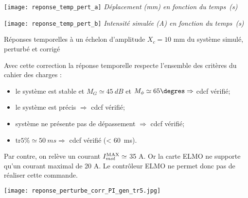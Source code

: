 \begin{marginfigure}
\texttt{[image: reponse\_temp\_pert\_a]}
\textit{Déplacement (mm) en fonction du temps~(s)}

\texttt{[image: reponse\_temp\_pert\_b]}
\textit{Intensité simulée (A) en fonction du temps~(s)}

 \caption{Réponses temporelles à un échelon d'amplitude $X_c = 10$ mm du système simulé, perturbé et corrigé \label{fig:reponse_perturbe_corr_PI_gen}}
\end{marginfigure}

\fi




\ifprof
\begin{corrige}
Avec cette correction la réponse temporelle respecte l'ensemble des critères du cahier des charges :\\
\begin{itemize}
\item le système est stable et $M_G \simeq \SI{45}{dB}$ et $M_{\phi} \simeq 65\degres  \Rightarrow $ cdcf vérifié;
\item le système est précis $ \Rightarrow $ cdcf vérifié;
\item système ne présente pas de dépassement $ \Rightarrow $ cdcf vérifié;
\item tr$5\% \simeq \SI{50}{ms}  \Rightarrow $ cdcf vérifié (< \SI{60}{ms}).
\end{itemize}
Par contre, on relève un courant $I_{mot}^{\text{\text{MAX}}} \simeq$ 35 A. Or la carte ELMO ne supporte qu'un courant maximal de 20 A. Le contrôleur ELMO ne permet donc pas de réaliser cette commande. 


\begin{center}
      \texttt{[image: reponse\_perturbe\_corr\_PI\_gen\_tr5.jpg]}
\end{center}
\end{corrige}
\fi

